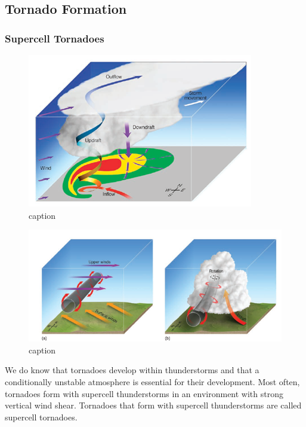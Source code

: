 \documentclass[12pt,oneside]{book}
\begin{document}
\subsection{Tornado Formation}\label{tornado-formation}

\subsubsection{Supercell Tornadoes}\label{supercell-tornadoes}

\begin{figure}

{\centering \includegraphics[width=0.8\linewidth]{figures/FigureE8} 

}

\caption{caption}\label{fig:SupercellTornadoes}
\end{figure}

\begin{figure}

{\centering \includegraphics[width=0.8\linewidth]{figures/FigureE9} 

}

\caption{caption}\label{fig:SupercellTornadoes2}
\end{figure}

We do know that tornadoes develop within thunderstorms and that a
conditionally unstable atmosphere is essential for their development.
Most often, tornadoes form with supercell thunderstorms in an
environment with strong vertical wind shear. Tornadoes that form with
supercell thunderstorms are called supercell tornadoes.
\end{document}
